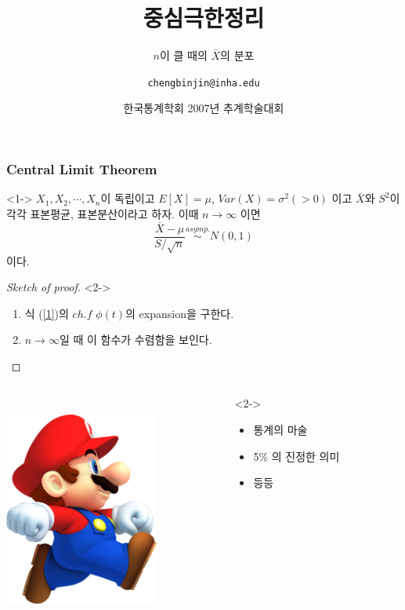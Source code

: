 \documentclass{beamer}
\title{중심극한정리}
\subtitle{$n$이 클 때의 $\bar{X}$의 분포}
\author[Cheng-Bin Jin]{\texttt{chengbinjin@inha.edu}}
\date[\today]{한국통계학회 2007년 추계학술대회}
\institute{인하대 정보통신학과}
\begin{document}

\begin{frame}
\titlepage
\end{frame}

\begin{frame}
\frametitle{Central Limit Theorem}
\begin{theorem}<1->
$X_1, X_2, \cdots, X_n$이 독립이고 $E[X] = \mu$,
$Var(X)=\sigma^2 (>0)$ 이고 $\bar{X}$와 $S^2$이 각각
표본평균, 표본분산이라고 하자.
이때 $n \rightarrow \infty$ 이면
\begin{equation} \label{1}
\frac{\bar{X} - \mu}{S/\sqrt{n}} \stackrel{asymp.}{\sim}N(0,1)
\end{equation}
이다.
\end{theorem}
\begin{proof}[Sketch of proof]<2->
\begin{enumerate}
\item<3-> 식 (\ref{1})의 $ch.f$ $\phi(t)$의 expansion을 구한다.
\item<4-> $n \rightarrow \infty$일 때 이 함수가 수렴함을 보인다.
\end{enumerate}
\end{proof}
\end{frame}

\begin{frame}
\begin{columns}[T]
\begin{column}{3in}
\centerline{
\includegraphics[width=2in, height=3in]{../images/mari.png}}
\end{column}
\begin{column}{8cm}<2->
\begin{itemize}
\item 통계의 마술
\item 5\% 의 진정한 의미
\item 등등
\end{itemize}
\end{column}
\end{columns}
\end{frame}
\end{document}
